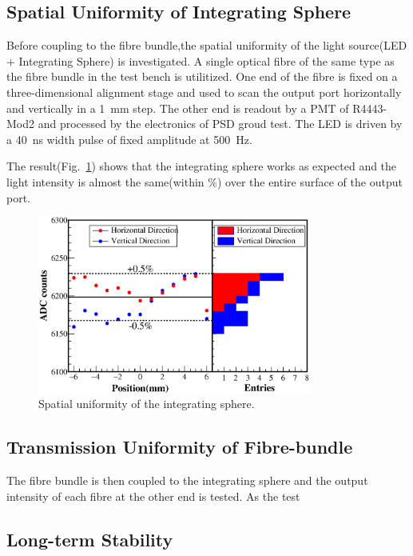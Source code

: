 \documentclass[5p, times]{elsarticle}
\begin{document}
\subsection{Spatial Uniformity of Integrating Sphere}
\label{sec:spatialuniformity_insph}

Before coupling to the fibre bundle,the spatial uniformity of the light source(LED + Integrating Sphere) is investigated. 
A single optical fibre of the same type as the fibre bundle in the test bench is utilitized.
One end of the fibre is fixed on a three-dimensional alignment stage and used to scan the output port horizontally and vertically in a \SI{1}{\milli\meter} step.
The other end is readout by a PMT of R4443-Mod2 and processed by the electronics of PSD groud test.
The LED is driven by a \SI{40}{\nano\second} width pulse of fixed amplitude at \SI{500}{\Hz}.

The result(Fig.~\ref{fig:uniformity_integratingsphere}) shows that the integrating sphere works as expected and the light intensity is almost the same(within \%) over the entire surface of the output port.   


\begin{figure}[h!]
 \centering
 \includegraphics[width=90mm]{uniformity_integratingsphere}
\caption{Spatial uniformity of the integrating sphere.}
\label{fig:uniformity_integratingsphere}
\end{figure} 

\subsection{Transmission Uniformity of Fibre-bundle}
\label{sec:transuniformity_fibre}

The fibre bundle is then coupled to the integrating sphere and the output intensity of each fibre at the other end is tested.
As the test 

\subsection{Long-term Stability}
\label{sec:longterm_stability}
\end{document}
